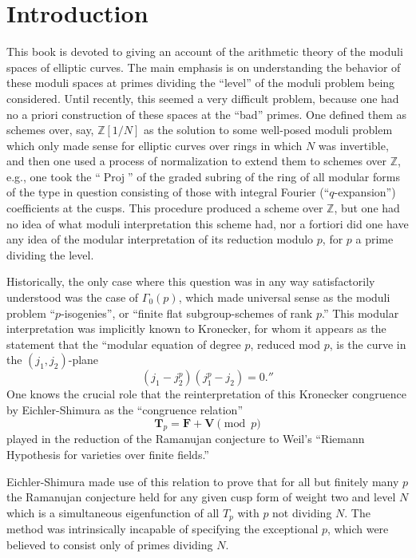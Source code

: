 \tableofcontents
\cleardoublepage

\chapter*{Introduction}

This book is devoted to giving an account of the arithmetic theory of the moduli spaces of elliptic curves. The main emphasis is on understanding the behavior of these moduli spaces at primes dividing the ``level'' of the moduli problem being considered. Until recently, this seemed a very difficult problem, because one had no a priori construction of these spaces at the ``bad'' primes. One defined them as schemes over, say, $\mathbb{Z}[1/N]$ as the solution to some well-posed moduli problem which only made sense for elliptic curves over rings in which $N$ was invertible, and then one used a process of normalization to extend them to schemes over $\mathbb{Z}$, e.g., one took the ``$\operatorname{Proj}$'' of the graded subring of the ring of all modular forms of the type in question consisting of those with integral Fourier (``$q$-expansion'') coefficients at the cusps. This procedure produced a scheme over $\mathbb{Z}$, but one had no idea of what moduli interpretation this scheme had, nor a fortiori did one have any idea of the modular interpretation of its reduction modulo $p$, for $p$ a prime dividing the level.

Historically, the only case where this question was in any way satisfactorily understood was the case of $\Gamma_0(p)$, which made universal sense as the moduli problem ``$p$-isogenies'', or ``finite flat subgroup-schemes of rank $p$.'' This modular interpretation was implicitly known to Kronecker, for whom it appears as the statement that the ``modular equation of degree $p$, reduced mod $p$, is the curve in the $(j_1, j_2)$-plane
\[
(j_1 - j_2^p)(j_1^p - j_2) = 0.''
\]
One knows the crucial role that the reinterpretation of this Kronecker congruence by Eichler-Shimura as the ``congruence relation''
\[
\mathbf{T}_p = \mathbf{F} + \mathbf{V} \pmod p
\]
played in the reduction of the Ramanujan conjecture to Weil's ``Riemann Hypothesis for varieties over finite fields.''

Eichler-Shimura made use of this relation to prove that for all but finitely many $p$ the Ramanujan conjecture held for any given cusp form of weight two and level $N$ which is a simultaneous eigenfunction of all $T_p$ with $p$ not dividing $N$. The method was intrinsically incapable of specifying the exceptional $p$, which were believed to consist only of primes dividing $N$.

